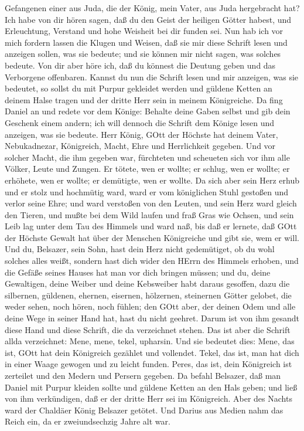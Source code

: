 Gefangenen einer aus Juda, die der König, mein Vater, aus Juda
hergebracht hat?  Ich habe von dir hören sagen, daß du den
Geist der heiligen Götter habest, und Erleuchtung, Verstand und hohe
Weisheit bei dir funden sei.  Nun hab ich vor mich fordern
lassen die Klugen und Weisen, daß sie mir diese Schrift lesen und
anzeigen sollen, was sie bedeute; und sie können mir nicht sagen, was
solches bedeute.  Von dir aber höre ich, daß du könnest die
Deutung geben und das Verborgene offenbaren. Kannst du nun die Schrift
lesen und mir anzeigen, was sie bedeutet, so sollst du mit Purpur
gekleidet werden und güldene Ketten an deinem Halse tragen und der
dritte Herr sein in meinem Königreiche.  Da fing Daniel an
und redete vor dem Könige: Behalte deine Gaben selbst und gib dein
Geschenk einem andern; ich will dennoch die Schrift dem Könige lesen und
anzeigen, was sie bedeute.  Herr König, GOtt der Höchste
hat deinem Vater, Nebukadnezar, Königreich, Macht, Ehre und Herrlichkeit
gegeben.  Und vor solcher Macht, die ihm gegeben war,
fürchteten und scheueten sich vor ihm alle Völker, Leute und Zungen. Er
tötete, wen er wollte; er schlug, wen er wollte; er erhöhete, wen er
wollte; er demütigte, wen er wollte.  Da sich aber sein
Herz erhub und er stolz und hochmütig ward, ward er vom königlichen
Stuhl gestoßen und verlor seine Ehre;  und ward verstoßen
von den Leuten, und sein Herz ward gleich den Tieren, und mußte bei dem
Wild laufen und fraß Gras wie Ochsen, und sein Leib lag unter dem Tau
des Himmels und ward naß, bis daß er lernete, daß GOtt der Höchste
Gewalt hat über der Menschen Königreiche und gibt sie, wem er will.
 Und du, Belsazer, sein Sohn, hast dein Herz nicht
gedemütiget, ob du wohl solches alles weißt,  sondern hast
dich wider den HErrn des Himmels erhoben, und die Gefäße seines Hauses
hat man vor dich bringen müssen; und du, deine Gewaltigen, deine Weiber
und deine Kebsweiber habt daraus gesoffen, dazu die silbernen, güldenen,
ehernen, eisernen, hölzernen, steinernen Götter gelobet, die weder
sehen, noch hören, noch fühlen; den GOtt aber, der deinen Odem und alle
deine Wege in seiner Hand hat, hast du nicht geehret. 
Darum ist von ihm gesandt diese Hand und diese Schrift, die da
verzeichnet stehen.  Das ist aber die Schrift allda
verzeichnet: Mene, mene, tekel, upharsin.  Und sie bedeutet
dies: Mene, das ist, GOtt hat dein Königreich gezählet und vollendet.
 Tekel, das ist, man hat dich in einer Waage gewogen und zu
leicht funden.  Peres, das ist, dein Königreich ist
zerteilet und den Medern und Persern gegeben.  Da befahl
Belsazer, daß man Daniel mit Purpur kleiden sollte und güldene Ketten an
den Hals geben; und ließ von ihm verkündigen, daß er der dritte Herr sei
im Königreich.  Aber des Nachts ward der Chaldäer König
Belsazer getötet.  Und Darius aus Medien nahm das Reich
ein, da er zweiundsechzig Jahre alt war.

